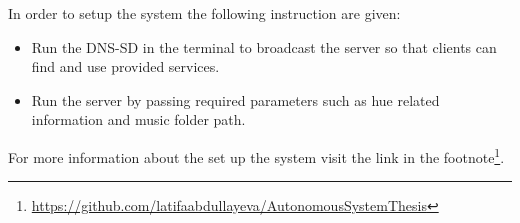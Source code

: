 In order to setup the system the following instruction are given:
\begin{itemize}
    \item Run the DNS-SD in the terminal to broadcast the server so that clients can find and use provided services.
    \item Run the server by passing required parameters such as hue related information and music folder path.
\end{itemize}
For more information about the set up the system visit the link in the
footnote\footnote{\url{https://github.com/latifaabdullayeva/AutonomousSystemThesis}}.


